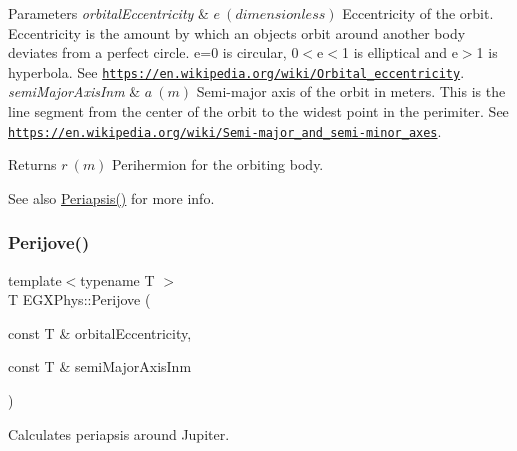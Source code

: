 \begin{DoxyParams}{Parameters}
{\em orbital\+Eccentricity} & $ e\ (dimensionless)$ Eccentricity of the orbit. Eccentricity is the amount by which an objects orbit around another body deviates from a perfect circle. e=0 is circular, 0$<$e$<$1 is elliptical and e$>$1 is hyperbola. See \href{https://en.wikipedia.org/wiki/Orbital_eccentricity}{\tt https\+://en.\+wikipedia.\+org/wiki/\+Orbital\+\_\+eccentricity}. \\
\hline
{\em semi\+Major\+Axis\+Inm} & $ a\ (m)$ Semi-\/major axis of the orbit in meters. This is the line segment from the center of the orbit to the widest point in the perimiter. See \href{https://en.wikipedia.org/wiki/Semi-major_and_semi-minor_axes}{\tt https\+://en.\+wikipedia.\+org/wiki/\+Semi-\/major\+\_\+and\+\_\+semi-\/minor\+\_\+axes}. \\
\hline
\end{DoxyParams}
\begin{DoxyReturn}{Returns}
$ r\ (m)$ Perihermion for the orbiting body. 
\end{DoxyReturn}
\begin{DoxySeeAlso}{See also}
\mbox{\hyperlink{group___e_g_x_phys-_periapsis_gad487212733711bc2ce73c8137c9309c3}{Periapsis()}} for more info. 
\end{DoxySeeAlso}
\mbox{\label{group___e_g_x_phys-_periapsis_gae1daec11bd7b479853ba92ca6368a23c}} 
\subsubsection{\texorpdfstring{Perijove()}{Perijove()}}
{\footnotesize\ttfamily template$<$typename T $>$ \\
T E\+G\+X\+Phys\+::\+Perijove (\begin{DoxyParamCaption}\item[{const T \&}]{orbital\+Eccentricity,  }\item[{const T \&}]{semi\+Major\+Axis\+Inm }\end{DoxyParamCaption})}



Calculates periapsis around Jupiter. 



